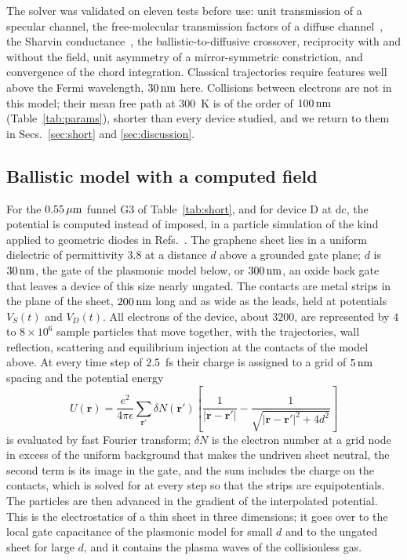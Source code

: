 The solver was validated on eleven tests before use: unit transmission of a
specular channel, the free-molecular transmission factors of a diffuse
channel~\cite{richley1964numerical}, the Sharvin
conductance~\cite{sharvin1965possible}, the ballistic-to-diffusive crossover, reciprocity with and
without the field, unit asymmetry of a mirror-symmetric constriction, and
convergence of the chord integration. Classical trajectories require
features well above the Fermi wavelength, $30\,\mathrm{nm}$ here. Collisions
between electrons are not in this model; their mean free path at $300$~K
is of the order of $100\,\mathrm{nm}$ (Table~\ref{tab:params}), shorter than
every device studied, and we return to them in Secs.~\ref{sec:short} and
\ref{sec:discussion}.

\subsection{Ballistic model with a computed field}
\label{sec:model-pic}

For the $0.55\,\mu\mathrm{m}$ funnel G3 of Table~\ref{tab:short}, and for device D
at dc, the potential is computed instead of imposed, in a particle simulation of the kind applied to geometric diodes in
Refs.~\cite{stearns2020high,stearns2021simulation}. The graphene sheet
lies in a uniform dielectric of permittivity $3.8$ at a distance $d$ above
a grounded gate plane; $d$ is $30\,\mathrm{nm}$, the gate of the plasmonic model
below, or $300\,\mathrm{nm}$, an oxide back gate that leaves a device of this size
nearly ungated. The contacts are metal strips in the plane of the sheet,
$200\,\mathrm{nm}$ long and as wide as the leads, held at potentials $V_{S}(t)$ and
$V_{D}(t)$. All electrons of the device, about $3200$, are represented by
$4$ to $8\times10^{6}$ sample particles that move together, with the
trajectories, wall reflection, scattering and equilibrium injection at the
contacts of the model above. At every time step of $2.5$~fs their charge
is assigned to a grid of $5\,\mathrm{nm}$ spacing and the potential energy
\begin{equation}
U(\bm{r})=\frac{e^{2}}{4\pi\epsilon}\sum_{\bm{r}'}\delta N(\bm{r}')
\left[\frac{1}{|\bm{r}-\bm{r}'|}-\frac{1}{\sqrt{|\bm{r}-\bm{r}'|^{2}+4d^{2}}}\right]
\label{eq:kernel}
\end{equation}
is evaluated by fast Fourier transform; $\delta N$ is the electron number
at a grid node in excess of the uniform background that makes the undriven
sheet neutral, the second term is its image in the gate, and the sum
includes the charge on the contacts, which is solved for at every step so
that the strips are equipotentials. The particles are then advanced in
the gradient of the interpolated potential. This is the electrostatics of
a thin sheet in three dimensions; it goes over to the local gate
capacitance of the plasmonic model for small $d$ and to the ungated sheet
for large $d$, and it contains the plasma waves of the collisionless gas.

